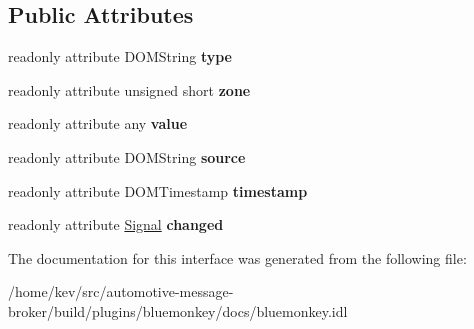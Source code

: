 \subsection*{Public Attributes}
\begin{DoxyCompactItemize}
\item 
\hypertarget{interfacePropertyInterface_a69c6755ab96139a85da8b65272bbd996}{readonly attribute D\+O\+M\+String {\bfseries type}}\label{interfacePropertyInterface_a69c6755ab96139a85da8b65272bbd996}

\item 
\hypertarget{interfacePropertyInterface_a92a2a73b798927b70025f02e9b376acb}{readonly attribute unsigned short {\bfseries zone}}\label{interfacePropertyInterface_a92a2a73b798927b70025f02e9b376acb}

\item 
\hypertarget{interfacePropertyInterface_a411fe0e15a26122a8d9f0171ce2009fd}{readonly attribute any {\bfseries value}}\label{interfacePropertyInterface_a411fe0e15a26122a8d9f0171ce2009fd}

\item 
\hypertarget{interfacePropertyInterface_a97037542fd4d52e143c2259b295f5abd}{readonly attribute D\+O\+M\+String {\bfseries source}}\label{interfacePropertyInterface_a97037542fd4d52e143c2259b295f5abd}

\item 
\hypertarget{interfacePropertyInterface_a10aca1fa825b1bf889dedb51ef816f82}{readonly attribute D\+O\+M\+Timestamp {\bfseries timestamp}}\label{interfacePropertyInterface_a10aca1fa825b1bf889dedb51ef816f82}

\item 
\hypertarget{interfacePropertyInterface_a839e9874320c062715079736e5fe7d29}{readonly attribute \hyperlink{interfaceSignal}{Signal} {\bfseries changed}}\label{interfacePropertyInterface_a839e9874320c062715079736e5fe7d29}

\end{DoxyCompactItemize}


The documentation for this interface was generated from the following file\+:\begin{DoxyCompactItemize}
\item 
/home/kev/src/automotive-\/message-\/broker/build/plugins/bluemonkey/docs/bluemonkey.\+idl\end{DoxyCompactItemize}
